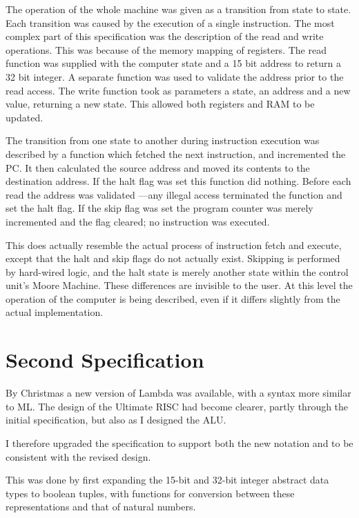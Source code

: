  The operation of the whole machine was  given as a transition from 
state to state. 
Each transition was caused by the  execution of
 a single instruction.
The most complex part of this specification was the description of the read and write operations.
This was because of the memory mapping of registers.
The read function was supplied with the computer state and a 15 bit address to return a 32 bit integer. 
A separate function was used to validate the address prior to the read access.
The write function took as parameters a  state, an address and a new value, returning a new state. This allowed both registers and RAM to be updated.

The transition from one state to another during instruction execution was described by a function which  fetched the next instruction, and incremented the PC.
It then calculated the source  address and moved its contents to the  destination address.  
If the halt flag was set this function did nothing. 
Before each read the address was validated ---any illegal access terminated the function and set the halt flag.
If the skip flag was set the program counter was merely incremented and the flag cleared; no instruction was executed.

This does actually resemble the actual process of instruction fetch
and execute, except that the halt and skip flags do not actually
exist. 
Skipping is performed by hard-wired logic, and the halt state is merely another state within the control unit's Moore Machine.
These differences are invisible to the user. 
At this level the operation of the computer is being described, even if it differs slightly from the actual implementation.


\section{Second Specification}

By Christmas a new version of Lambda was available, with a syntax more  similar to ML. The design of the Ultimate RISC had become clearer, partly through the initial specification, but also as I  designed the ALU.

I therefore upgraded the specification to support both the new notation and to be consistent with the revised design.

This was done by first expanding the 15-bit and 32-bit integer abstract data types to  boolean tuples, with functions for conversion between these representations and that of natural numbers.

